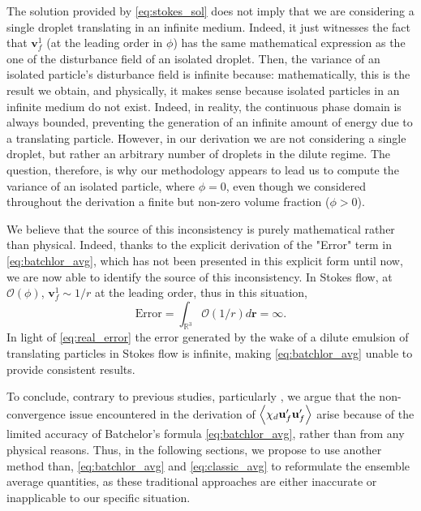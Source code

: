 The solution provided by \ref{eq:stokes_sol} does not imply that we are considering a single droplet translating in an infinite medium.
Indeed, it just witnesses the fact that  $\textbf{v}_f^{1}$ (at the leading order in $\phi$) has the same mathematical expression as the one of the disturbance field of an isolated droplet. 
Then, the variance of an isolated particle's disturbance field is infinite because: mathematically, this is the result we obtain, and physically, it makes sense because isolated particles in an infinite medium do not exist. 
Indeed, in reality, the continuous phase domain is always bounded, preventing the generation of an infinite amount of energy due to a translating particle.
However, in our derivation we are not considering a single droplet, but rather an arbitrary number of droplets in the dilute regime.   
The question, therefore, is why our methodology appears to lead us to compute the variance of an isolated particle, where $\phi = 0$, even though we considered throughout the derivation a finite but non-zero volume fraction ($\phi > 0$).

We believe that the source of this inconsistency is purely mathematical rather than physical. 
Indeed, thanks to the explicit derivation of the "Error" term in \ref{eq:batchlor_avg}, which has not been presented in this explicit form until now, we are now able to identify the source of this inconsistency.
In Stokes flow, at $\mathcal{O}(\phi)$, $\textbf{v}_f^{1} \sim 1/r$ at the leading order, thus in this situation, 
\begin{equation}
    \text{Error}
    = 
    \int_{\mathbb{R}^3} 
    \mathcal{O}(1/r) d\textbf{r}
    = \infty. 
    \label{eq:real_error}
\end{equation}
In light of \ref{eq:real_error} the error generated by the wake of a dilute emulsion of translating particles in Stokes flow is infinite, making \ref{eq:batchlor_avg} unable to provide consistent results. 


To conclude, contrary to previous studies, particularly \citet{caflisch1985variance}, we argue that the non-convergence issue encountered in the derivation of $\left<\chi_d \textbf{u}_f'\textbf{u}_f'\right>$ arise because of the limited accuracy of Batchelor's formula \eqref{eq:batchlor_avg}, rather than from any physical reasons.
Thus, in the following sections, we propose to use another method than, \ref{eq:batchlor_avg} and \ref{eq:classic_avg} to reformulate the ensemble average quantities, as these traditional approaches are either inaccurate or inapplicable to our specific situation. 





